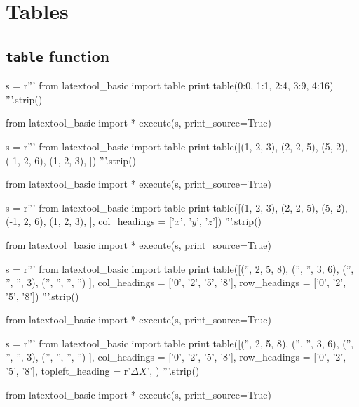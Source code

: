 \section{Tables}

\subsection{\texttt{table} function}

\begin{python}
s = r'''
from latextool_basic import table
print table({0:0, 1:1, 2:4, 3:9, 4:16})
'''.strip()

from latextool_basic import *
execute(s, print_source=True)
\end{python}


\begin{python}
s = r'''
from latextool_basic import table
print table([(1, 2, 3),
             (2, 2, 5),
             (5, 2),
             (-1, 2, 6),
             (1, 2, 3),
            ])
'''.strip()

from latextool_basic import *
execute(s, print_source=True)
\end{python}


\begin{python}
s = r'''
from latextool_basic import table
print table([(1, 2, 3),
             (2, 2, 5),
             (5, 2),
             (-1, 2, 6),
             (1, 2, 3),
            ],
            col_headings = ['$x$', '$y$', '$z$'])
'''.strip()

from latextool_basic import *
execute(s, print_source=True)
\end{python}


\begin{python}
s = r'''
from latextool_basic import table
print table([('',  2, 5,  8),
             ('', '', 3,  6),
             ('', '', '', 3),
             ('', '', '', '')
            ],
            col_headings = ['0', '2', '5', '8'],
            row_headings = ['0', '2', '5', '8'])
'''.strip()

from latextool_basic import *
execute(s, print_source=True)
\end{python}


\begin{python}
s = r'''
from latextool_basic import table
print table([('',  2, 5,  8),
             ('', '', 3,  6),
             ('', '', '', 3),
             ('', '', '', '')
            ],
            col_headings = ['0', '2', '5', '8'],
            row_headings = ['0', '2', '5', '8'],
            topleft_heading = r'$\Delta X$',
           )
'''.strip()

from latextool_basic import *
execute(s, print_source=True)
\end{python}

